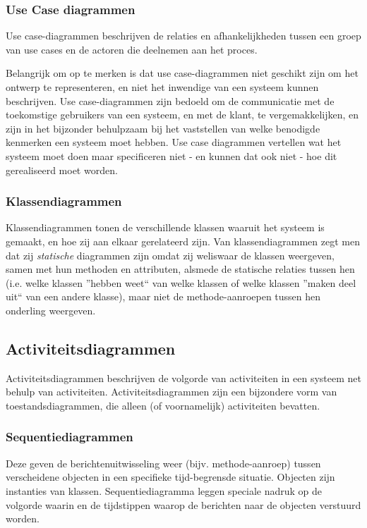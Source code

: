 \subsubsection{Use Case diagrammen}
Use case-diagrammen beschrijven de relaties en afhankelijkheden tussen een groep van use cases en de actoren die deelnemen aan het proces.

Belangrijk om op te merken is dat use case-diagrammen niet geschikt zijn om het ontwerp te representeren, en niet het inwendige van een systeem kunnen beschrijven. Use case-diagrammen zijn bedoeld om de communicatie met de toekomstige gebruikers van een systeem, en met de klant, te vergemakkelijken, en zijn in het bijzonder behulpzaam bij het vaststellen van welke benodigde kenmerken een systeem moet hebben. Use case diagrammen vertellen wat het systeem moet doen maar specificeren niet - en kunnen dat ook niet - hoe dit gerealiseerd moet worden.

\subsubsection{Klassendiagrammen}
Klassendiagrammen tonen de verschillende klassen waaruit het systeem is gemaakt, en hoe zij aan elkaar gerelateerd zijn. Van klassendiagrammen zegt men dat zij \textit{statische} diagrammen zijn omdat zij weliswaar de klassen weergeven, samen met hun methoden en attributen, alsmede de statische relaties tussen hen (i.e. welke klassen ''hebben weet`` van welke klassen of welke klassen ''maken deel uit`` van een andere klasse), maar niet de methode-aanroepen tussen hen onderling weergeven. 

\subsection{Activiteitsdiagrammen}
Activiteitsdiagrammen beschrijven de volgorde van activiteiten in een systeem net behulp van activiteiten. Activiteitsdiagrammen zijn een bijzondere vorm van toestandsdiagrammen, die alleen (of voornamelijk) activiteiten bevatten. 

\subsubsection{Sequentiediagrammen}
Deze geven de berichtenuitwisseling weer (bijv. methode-aanroep) tussen verscheidene objecten in een specifieke tijd-begrensde situatie. Objecten zijn instanties van klassen. Sequentiediagramma leggen speciale nadruk op de volgorde waarin en de tijdstippen waarop de berichten naar de objecten verstuurd worden.

